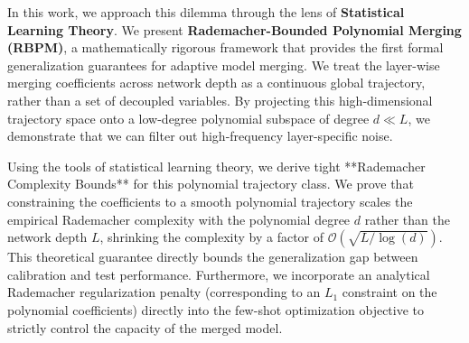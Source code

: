 In this work, we approach this dilemma through the lens of \textbf{Statistical Learning Theory}. We present \textbf{Rademacher-Bounded Polynomial Merging (RBPM)}, a mathematically rigorous framework that provides the first formal generalization guarantees for adaptive model merging. We treat the layer-wise merging coefficients across network depth as a continuous global trajectory, rather than a set of decoupled variables. By projecting this high-dimensional trajectory space onto a low-degree polynomial subspace of degree $d \ll L$, we demonstrate that we can filter out high-frequency layer-specific noise.

Using the tools of statistical learning theory, we derive tight **Rademacher Complexity Bounds** for this polynomial trajectory class. We prove that constraining the coefficients to a smooth polynomial trajectory scales the empirical Rademacher complexity with the polynomial degree $d$ rather than the network depth $L$, shrinking the complexity by a factor of $\mathcal{O}(\sqrt{L / \log(d)})$. This theoretical guarantee directly bounds the generalization gap between calibration and test performance. Furthermore, we incorporate an analytical Rademacher regularization penalty (corresponding to an $L_1$ constraint on the polynomial coefficients) directly into the few-shot optimization objective to strictly control the capacity of the merged model.

